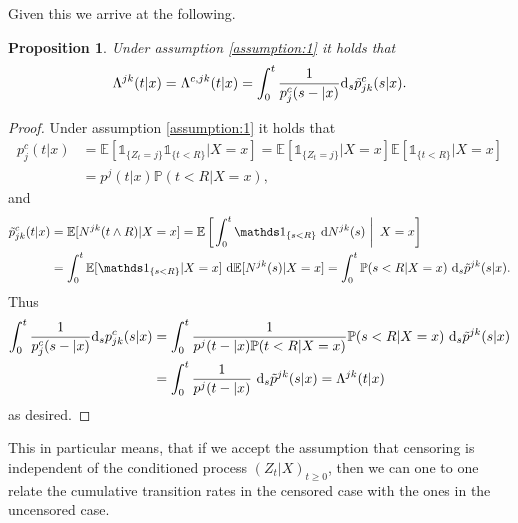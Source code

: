 \documentclass[12pt,letter,twoside]{article}
\theoremstyle{plain}
\newtheorem{proposition}[theorem]{Proposition}
\theoremstyle{definition}
\theoremstyle{remark}
\begin{document}
Given this we arrive at the following.
\begin{proposition}
Under assumption \ref{assumption:1} it holds that
\begin{align}
\Lambda^{jk}(t\vert x)=\Lambda^{c,jk}(t\vert x)=\int_0^t \frac{1}{p^c_j(s-\vert x)}\text d_s\tilde p^c_{jk}(s\vert x).
\end{align}
\end{proposition}
\begin{proof}
Under assumption \ref{assumption:1} it holds that
\begin{align}
p^c_j(t\vert  x)&=\mathbb E[\mathds 1_{\{Z_t=j\}}\mathds 1_{\{t< R\}}\vert  X=x]=\mathbb E[\mathds 1_{\{Z_t=j\}}\vert  X=x]\mathbb E[\mathds 1_{\{t< R\}}\vert  X=x]\\
&=p^j(t\vert x)\mathbb P(t<R\vert X=x),
\end{align}
and
\begin{align}
\tilde p^c_{jk}(t\vert  x)&=\mathbb E[N^{jk}(t\wedge R)\vert  X=x]=\mathbb E \left[\left.\int_0^t \mathds 1_{\{s<R\}}\ \text dN^{jk}(s) \ \right\vert\  X=x\right]\\
&=\int_0^t \mathbb E[\mathds 1_{\{s<R\}}\vert  X=x]\ \text d\mathbb E[N^{jk}(s)\vert  X=x]=\int_0^t \mathbb P(s <R\vert X=x)\ \text d_s\tilde p^{jk}(s\vert x).
\end{align}
Thus
\begin{align}
\int_0^t \frac{1}{p^c_j(s-\vert x)}\text d_sp^c_{jk}(s\vert x)&=\int_0^t \frac{1}{p^j(t-\vert x)\mathbb P(t<R\vert X=x)}\mathbb P(s <R\vert X=x)\ \text d_s\tilde p^{jk}(s\vert x)\\
&=\int_0^t \frac{1}{p^j(t-\vert x)}\ \text d_s\tilde p^{jk}(s\vert x)=\Lambda^{jk}(t\vert x)
\end{align}
as desired.
\end{proof}
This in particular means, that if we accept the assumption that censoring is independent of the conditioned process $(Z_t\vert X)_{t\ge 0}$, then we can one to one relate the cumulative transition rates in the censored case with the ones in the uncensored case.
\end{document}
